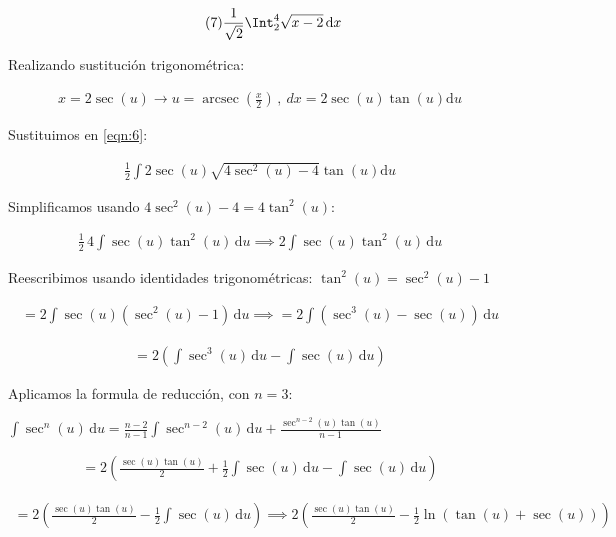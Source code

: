 \documentclass[12pt]{article}
\DeclareMathOperator{\arcsec}{arcsec}
\begin{document}
\begin{equation}\label{eqn:7}\tag{7}
	\frac{1}{\sqrt{2}} \Int_2^4 \sqrt{x-2}\, \mathrm{d}x
\end{equation}

\noindent Realizando sustitución trigonométrica:

\begin{align*}
	x = 2 \sec(u) \to u = \arcsec(\frac{x}{2})\, , \ dx=2\sec(u)\tan(u) \mathrm{d}u
\end{align*}

\noindent Sustituimos en \eqref{eqn:6}:

\begin{align*}
	\frac{1}{2} \int 2\sec(u)\sqrt{4\sec^2(u)-4}\tan(u) \mathrm{d}u
\end{align*}

\noindent Simplificamos usando $4\sec^2(u)-4 = 4\tan^2(u)$:

\begin{align*}
	\frac{1}{2}\, 4\int \sec(u)\tan^2(u)\, \mathrm{d}u \implies 2\int \sec(u)\tan^2(u)\, \mathrm{d}u
\end{align*}

\noindent Reescribimos usando identidades trigonométricas: $\tan^2(u)=\sec^2(u)-1$

\begin{align*}
	= 2\int \sec(u)(\sec^2(u)-1)\, \mathrm{d}u \implies = 2\int (\sec^3(u)-\sec(u))\, \mathrm{d}u
\end{align*}

\begin{align*}
	= 2\left(\int \sec^3(u)\, \mathrm{d}u - \int \sec(u)\, \mathrm{d}u\right)
\end{align*}

\noindent Aplicamos la formula de reducción, con $n=3$:

\begin{center}
	$\int \sec^n(u)\, \mathrm{d}u = \frac{n-2}{n-1} \int \sec^{n-2}(u)\, \mathrm{d}u + \frac{\sec^{n-2}(u)\tan(u)}{n-1}$
\end{center}

\begin{align*}
	= 2\left(\frac{\sec(u)\tan(u)}{2} + \frac{1}{2} \int \sec(u)\, \mathrm{d}u - \int \sec(u)\, \mathrm{d}u\right)
\end{align*}

\begin{align*}
	= 2\left(\frac{\sec(u)\tan(u)}{2} - \frac{1}{2}\int \sec(u)\, \mathrm{d}u\right) \implies 2\left(\frac{\sec(u)\tan(u)}{2} - \frac{1}{2}\ln(\tan(u)+\sec(u))\right)
\end{align*}
\end{document}
